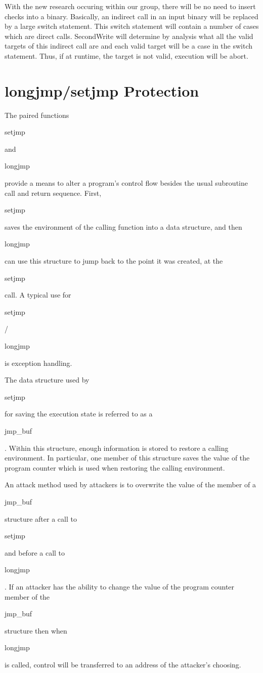 With the new research occuring within our group, there will be no need to insert checks into a
binary. Basically, an indirect call in an input binary will be replaced by a large switch statement.
This switch statement will contain a number of cases which are direct calls. SecondWrite will
determine by analysis what all the valid targets of this indirect call are and each valid target
will be a case in the switch statement. Thus, if at runtime, the target is not valid, execution will
be abort. 

\section{longjmp/setjmp Protection}

The paired functions \begin{em}setjmp\end{em} and \begin{em}longjmp\end{em} provide a means to alter
a program's control flow besides the usual subroutine call and return sequence. First,
\begin{em}setjmp\end{em} saves the environment of the calling function into a data structure, and
then \begin{em}longjmp\end{em} can use this structure to jump back to the point it was created, at
the \begin{em}setjmp\end{em} call. A typical use for
\begin{em}setjmp\end{em}/\begin{em}longjmp\end{em} is exception handling.

The data structure used by \begin{em}setjmp\end{em} for saving the execution state is referred to as a
\begin{em}jmp\_buf\end{em}. Within this structure, enough information is stored to restore a calling
environment. In particular, one member of this structure saves the value of the program counter
which is used when restoring the calling environment.

An attack method used by attackers is to overwrite the value of the member of a
\begin{em}jmp\_buf\end{em} structure after a call to \begin{em}setjmp\end{em} and before a call to
\begin{em}longjmp\end{em}. If an attacker has the ability to change the value of the program counter
member of the \begin{em}jmp\_buf\end{em} structure then when \begin{em}longjmp\end{em} is called,
control will be transferred to an address of the attacker's choosing.

